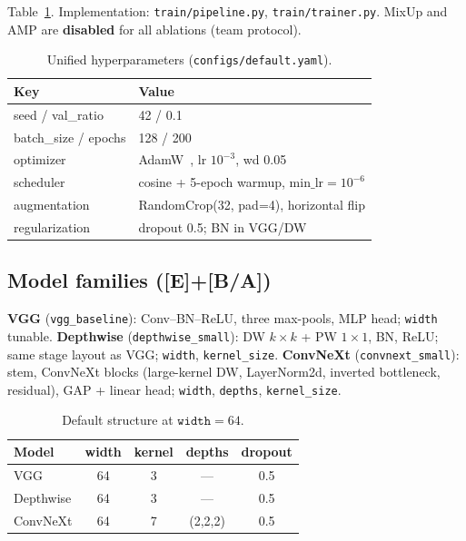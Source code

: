 \documentclass{article}
\newcommand{\grade}[1]{\textbf{\textcolor{blue!70!black}{[#1]}}}
\begin{document}
Table~\ref{tab:hyper}. Implementation: \texttt{train/pipeline.py}, \texttt{train/trainer.py}. MixUp and AMP are \textbf{disabled} for all ablations (team protocol).

\begin{table}[t]
  \caption{Unified hyperparameters (\texttt{configs/default.yaml}).}
  \label{tab:hyper}
  \centering
  \footnotesize
  \begin{tabular}{@{}ll@{}}
    \toprule
    Key & Value \\
    \midrule
    seed / val\_ratio & 42 / 0.1 \\
    batch\_size / epochs & 128 / 200 \\
    optimizer & AdamW~\cite{loshchilov2019adamw}, lr $10^{-3}$, wd 0.05 \\
    scheduler & cosine + 5-epoch warmup, $\mathrm{min\_lr}{=}10^{-6}$ \\
    augmentation & RandomCrop(32, pad=4), horizontal flip \\
    regularization & dropout 0.5; BN in VGG/DW \\
    \bottomrule
  \end{tabular}
\end{table}

\subsection{Model families (\grade{E}+\grade{B/A})}

\textbf{VGG} (\texttt{vgg\_baseline}): Conv--BN--ReLU, three max-pools, MLP head; \texttt{width} tunable.
\textbf{Depthwise} (\texttt{depthwise\_small}): DW $k{\times}k$ + PW $1{\times}1$, BN, ReLU; same stage layout as VGG; \texttt{width}, \texttt{kernel\_size}.
\textbf{ConvNeXt} (\texttt{convnext\_small}): stem, ConvNeXt blocks (large-kernel DW, LayerNorm2d, inverted bottleneck, residual), GAP + linear head; \texttt{width}, \texttt{depths}, \texttt{kernel\_size}.

\begin{table}[t]
  \caption{Default structure at $\texttt{width}{=}64$.}
  \label{tab:struct}
  \centering
  \footnotesize
  \begin{tabular}{@{}lcccc@{}}
    \toprule
    Model & width & kernel & depths & dropout \\
    \midrule
    VGG & 64 & 3 & --- & 0.5 \\
    Depthwise & 64 & 3 & --- & 0.5 \\
    ConvNeXt & 64 & 7 & (2,2,2) & 0.5 \\
    \bottomrule
  \end{tabular}
\end{table}
\end{document}
